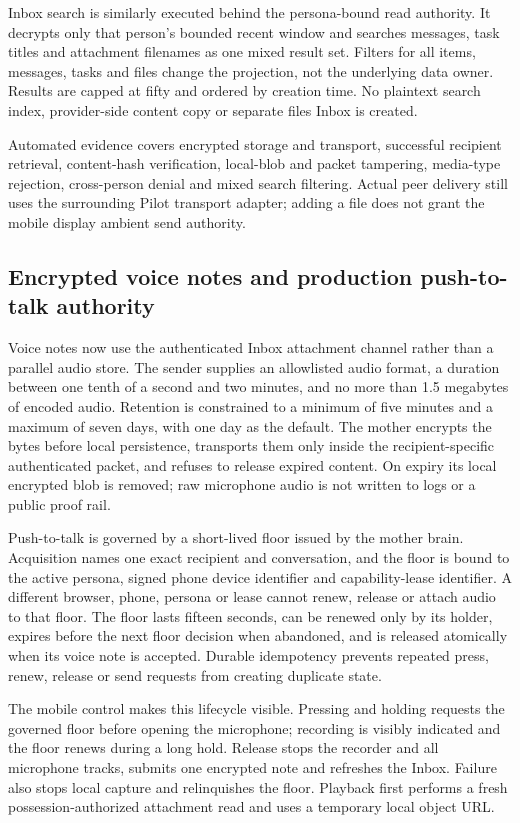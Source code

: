 Inbox search is similarly executed behind the persona-bound read authority.  It decrypts only
that person's bounded recent window and searches messages, task titles and attachment filenames
as one mixed result set.  Filters for all items, messages, tasks and files change the projection,
not the underlying data owner.  Results are capped at fifty and ordered by creation time.  No
plaintext search index, provider-side content copy or separate files Inbox is created.

Automated evidence covers encrypted storage and transport, successful recipient retrieval,
content-hash verification, local-blob and packet tampering, media-type rejection, cross-person
denial and mixed search filtering.  Actual peer delivery still uses the surrounding Pilot
transport adapter; adding a file does not grant the mobile display ambient send authority.

\subsection{Encrypted voice notes and production push-to-talk authority}

Voice notes now use the authenticated Inbox attachment channel rather than a parallel audio
store.  The sender supplies an allowlisted audio format, a duration between one tenth of a second
and two minutes, and no more than 1.5 megabytes of encoded audio.  Retention is constrained to a
minimum of five minutes and a maximum of seven days, with one day as the default.  The mother
encrypts the bytes before local persistence, transports them only inside the recipient-specific
authenticated packet, and refuses to release expired content.  On expiry its local encrypted
blob is removed; raw microphone audio is not written to logs or a public proof rail.

Push-to-talk is governed by a short-lived floor issued by the mother brain.  Acquisition names one
exact recipient and conversation, and the floor is bound to the active persona, signed phone
device identifier and capability-lease identifier.  A different browser, phone, persona or lease
cannot renew, release or attach audio to that floor.  The floor lasts fifteen seconds, can be
renewed only by its holder, expires before the next floor decision when abandoned, and is released
atomically when its voice note is accepted.  Durable idempotency prevents repeated press, renew,
release or send requests from creating duplicate state.

The mobile control makes this lifecycle visible.  Pressing and holding requests the governed
floor before opening the microphone; recording is visibly indicated and the floor renews during a
long hold.  Release stops the recorder and all microphone tracks, submits one encrypted note and
refreshes the Inbox.  Failure also stops local capture and relinquishes the floor.  Playback first
performs a fresh possession-authorized attachment read and uses a temporary local object URL.

